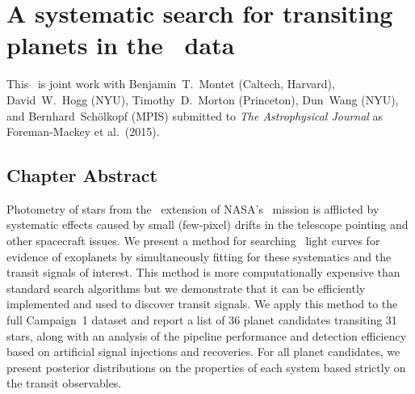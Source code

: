 \renewcommand{\chapid}{ketu}

\renewcommand{\kepler}{\project{Kepler}}
\newcommand{\KT}{\project{K2}}
\newcommand{\tess}{\project{TESS}}
\newcommand{\jwst}{\project{JWST}}
\newcommand{\pdc}{\project{PDC}}

\newcommand{\BIC}{{\ensuremath{\mathrm{BIC}}}}
\newcommand{\T}{\ensuremath{\mathrm{T}}}

\newcommand{\flux}{{\ensuremath{f}}}
\newcommand{\ferr}{{\ensuremath{\sigma_\flux}}}
\newcommand{\attime}{{\ensuremath{t}}}
\newcommand{\basis}{{\bvec{A}}}
\newcommand{\weights}{{\bvec{w}}}

\renewcommand{\period}{{\ensuremath{P}}}
\newcommand{\phase}{{\ensuremath{T^0}}}
\newcommand{\duration}{{\ensuremath{D}}}
\newcommand{\depth}{{\ensuremath{Z}}}
\newcommand{\transittime}{{\ensuremath{T}}}
\newcommand{\impact}{{\ensuremath{b}}}
\newcommand{\ecc}{{\ensuremath{e}}}
\newcommand{\pomega}{{\ensuremath{\omega}}}

\newcommand{\datareleaseurl}{{\url{http://bbq.dfm.io/ketu}}}

\newcommand{\response}[1]{#1}

\chapter{A systematic search for transiting planets in the \KT\ data}

This \paper\ is joint work with Benjamin~T.~Montet (Caltech, Harvard),
David~W.~Hogg (NYU), Timothy~D.~Morton (Princeton), Dun~Wang (NYU), and
Bernhard~Sch\"olkopf (MPIS) submitted to \emph{The Astrophysical Journal} as
Foreman-Mackey et al.\ (2015).

\section{Chapter Abstract}

Photometry of stars from the \KT\ extension of NASA's \kepler\ mission is
afflicted by systematic effects caused by small (few-pixel) drifts in the
telescope pointing and other spacecraft issues.
We present a method for searching \KT\ light curves for evidence of
exoplanets by simultaneously fitting for these systematics and the
transit signals of interest.
This method is more computationally expensive than standard search algorithms
but we demonstrate that it can be efficiently implemented and used to
discover transit signals.
We apply this method to the full Campaign~1 dataset and report a list of 36
planet candidates transiting 31 stars, along with an analysis of the pipeline
performance and detection efficiency based on artificial signal injections
and recoveries.
For all planet candidates, we present posterior distributions on the
properties of each system based strictly on the transit observables.

